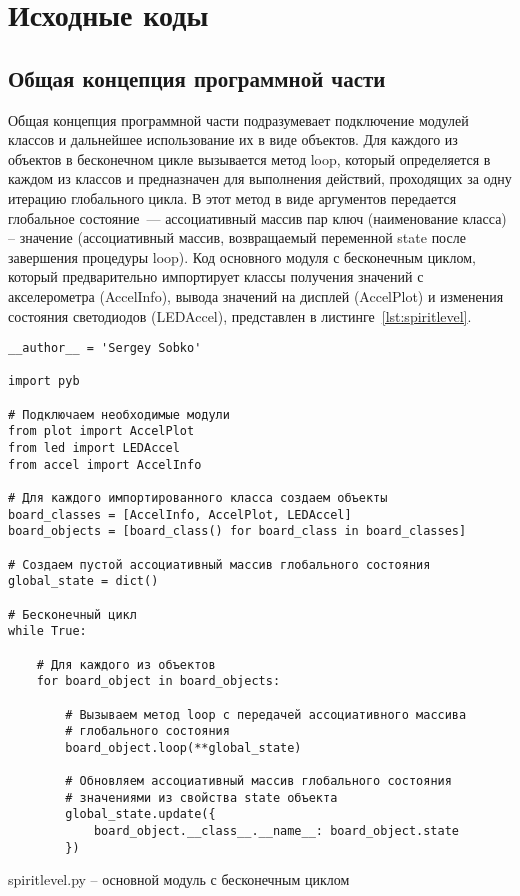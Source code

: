 \documentclass[document.tex]{subfiles}
\begin{document}
\section{Исходные коды}
\subsection{Общая концепция программной части}
Общая концепция программной части подразумевает подключение модулей классов и дальнейшее использование их в виде объектов. Для каждого из объектов в бесконечном цикле вызывается
метод loop, который определяется в каждом из классов и предназначен для выполнения действий, проходящих за одну итерацию глобального цикла. В этот метод в виде аргументов
передается глобальное состояние~--- ассоциативный массив пар ключ (наименование класса) -- значение (ассоциативный массив, возвращаемый переменной state после завер\-шения
процедуры loop). Код основного модуля с бесконечным циклом, который предварительно импортирует классы получения значений с акселерометра (AccelInfo), вывода значений на дисплей (AccelPlot) и
изменения состояния свето\-диодов (LEDAccel), пред\-ставлен в листинге~\ref{lst:spiritlevel}.

\begin{listing}[ht]
\begin{verbatim}
__author__ = 'Sergey Sobko'

import pyb

# Подключаем необходимые модули
from plot import AccelPlot
from led import LEDAccel
from accel import AccelInfo

# Для каждого импортированного класса создаем объекты
board_classes = [AccelInfo, AccelPlot, LEDAccel]
board_objects = [board_class() for board_class in board_classes]

# Создаем пустой ассоциативный массив глобального состояния
global_state = dict()

# Бесконечный цикл
while True:
    
    # Для каждого из объектов
    for board_object in board_objects:

        # Вызываем метод loop с передачей ассоциативного массива 
        # глобального состояния
        board_object.loop(**global_state)
        
        # Обновляем ассоциативный массив глобального состояния
        # значениями из свойства state объекта
        global_state.update({
            board_object.__class__.__name__: board_object.state
        })
\end{verbatim}
\caption{spiritlevel.py -- основной модуль с бесконечным циклом}
\label{lst:spiritlevel}
\end{listing}
\end{document}
